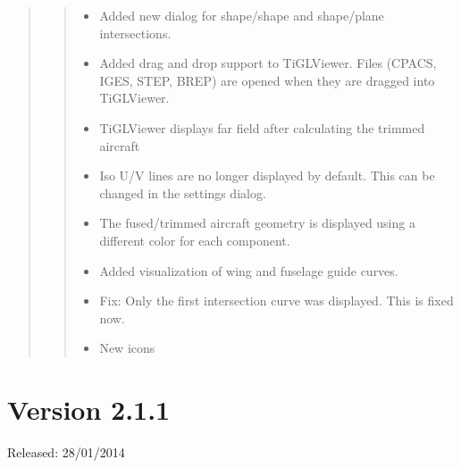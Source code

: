 \documentclass[]{scrartcl}
\begin{document}
\begin{quote}
\begin{itemize}
\begin{quote}
\begin{itemize}
\begin{description}
\begin{itemize}
    \end{itemize}
    \end{description}
  \item
    Added new dialog for shape/shape and shape/plane intersections.
  \item
    Added drag and drop support to TiGLViewer. Files (CPACS, IGES, STEP,
    BREP) are opened when they are dragged into TiGLViewer.
  \item
    TiGLViewer displays far field after calculating the trimmed aircraft
  \item
    Iso U/V lines are no longer displayed by default. This can be
    changed in the settings dialog.
  \item
    The fused/trimmed aircraft geometry is displayed using a different
    color for each component.
  \item
    Added visualization of wing and fuselage guide curves.
  \item
    Fix: Only the first intersection curve was displayed. This is fixed
    now.
  \item
    New icons
  \end{itemize}
  \end{quote}
\end{itemize}
\end{quote}

\section{Version 2.1.1}\label{version-2.1.1}

Released: 28/01/2014
\end{document}
